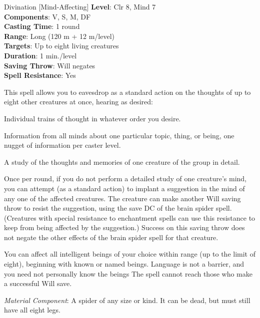 {Divination [Mind-Affecting]}
{
	\textbf{Level}: Clr 8, Mind 7\\
	\textbf{Components}: V, S, M, DF\\
	\textbf{Casting Time}: 1 round\\
	\textbf{Range}: Long (120 m + 12 m/level)\\
	\textbf{Targets}: Up to eight living creatures\\
	\textbf{Duration}: 1 min./level\\
	\textbf{Saving Throw}: Will negates\\
	\textbf{Spell Resistance}: Yes\\
}
{
	This spell allows you to eavesdrop as a standard action on the thoughts of up to eight other creatures at once, hearing as desired:
	\begin{itemize*}
		\item Individual trains of thought in whatever order you desire.
		\item Information from all minds about one particular topic, thing, or being, one nugget of information per caster level.
		\item A study of the thoughts and memories of one creature of the group in detail.
	\end{itemize*}

	Once per round, if you do not perform a detailed study of one creature's mind, you can attempt (as a standard action) to implant a suggestion in the mind of any one of the affected creatures. The creature can make another Will saving throw to resist the suggestion, using the save DC of the brain spider spell. (Creatures with special resistance to enchantment spells can use this resistance to keep from being affected by the suggestion.) Success on this saving throw does not negate the other effects of the brain spider spell for that creature.

	You can affect all intelligent beings of your choice within range (up to the limit of eight), beginning with known or named beings. Language is not a barrier, and you need not personally know the beings The spell cannot reach those who make a successful Will save.

	\textit{Material Component}: A spider of any size or kind. It can be dead, but must still have all eight legs.
}
